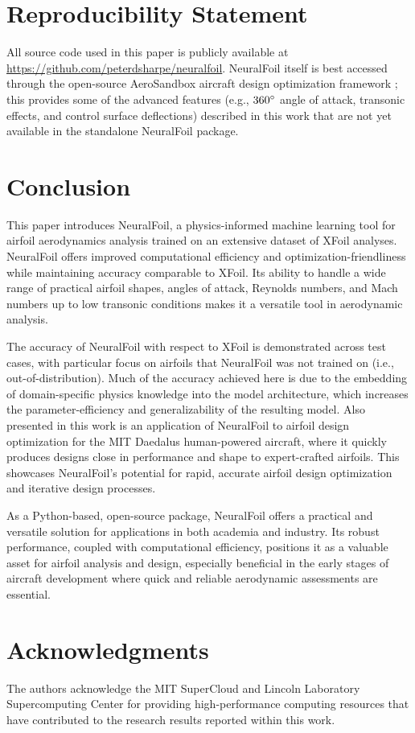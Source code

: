 \documentclass[conf]{new-aiaa}
\begin{document}
    \section{Reproducibility Statement}

    All source code used in this paper is publicly available at \url{https://github.com/peterdsharpe/neuralfoil}. NeuralFoil itself is best accessed through the open-source AeroSandbox aircraft design optimization framework \cite{sharpe_aerosandbox_2021}; this provides some of the advanced features (e.g., $360\degree$ angle of attack, transonic effects, and control surface deflections) described in this work that are not yet available in the standalone NeuralFoil package.


    \section{Conclusion}
    \label{sec:conclusion}

    This paper introduces NeuralFoil, a physics-informed machine learning tool for airfoil aerodynamics analysis trained on an extensive dataset of XFoil analyses. NeuralFoil offers improved computational efficiency and optimization-friendliness while maintaining accuracy comparable to XFoil. Its ability to handle a wide range of practical airfoil shapes, angles of attack, Reynolds numbers, and Mach numbers up to low transonic conditions makes it a versatile tool in aerodynamic analysis.

    The accuracy of NeuralFoil with respect to XFoil is demonstrated across test cases, with particular focus on airfoils that NeuralFoil was not trained on (i.e., out-of-distribution). Much of the accuracy achieved here is due to the embedding of domain-specific physics knowledge into the model architecture, which increases the parameter-efficiency and generalizability of the resulting model. Also presented in this work is an application of NeuralFoil to airfoil design optimization for the MIT Daedalus human-powered aircraft, where it quickly produces designs close in performance and shape to expert-crafted airfoils. This showcases NeuralFoil's potential for rapid, accurate airfoil design optimization and iterative design processes.

    As a Python-based, open-source package, NeuralFoil offers a practical and versatile solution for applications in both academia and industry. Its robust performance, coupled with computational efficiency, positions it as a valuable asset for airfoil analysis and design, especially beneficial in the early stages of aircraft development where quick and reliable aerodynamic assessments are essential.

    \section*{Acknowledgments}
    The authors acknowledge the MIT SuperCloud and Lincoln Laboratory Supercomputing Center for providing high-performance computing resources that have contributed to the research results reported within this work.

    
\end{document}
